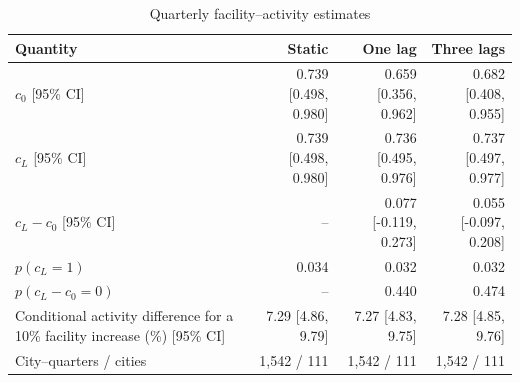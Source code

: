 \begin{table}[htbp]\centering\small\caption{Quarterly facility--activity estimates}\label{tab:quarterly_dynamic}
\begin{tabular}{@{}p{52mm}rrr@{}}\toprule
Quantity & Static & One lag & Three lags\\
\midrule
$c_0$ [95\% CI] & 0.739 [0.498, 0.980] & 0.659 [0.356, 0.962] & 0.682 [0.408, 0.955]\\
$c_L$ [95\% CI] & 0.739 [0.498, 0.980] & 0.736 [0.495, 0.976] & 0.737 [0.497, 0.977]\\
$c_L-c_0$ [95\% CI] & -- & 0.077 [-0.119, 0.273] & 0.055 [-0.097, 0.208]\\
$p(c_L=1)$ & 0.034 & 0.032 & 0.032\\
$p(c_L-c_0=0)$ & -- & 0.440 & 0.474\\
Conditional activity difference for a 10\% facility increase (\%) [95\% CI] & 7.29 [4.86, 9.79] & 7.27 [4.83, 9.75] & 7.28 [4.85, 9.76]\\
City--quarters / cities & 1,542 / 111 & 1,542 / 111 & 1,542 / 111\\
\bottomrule\end{tabular}\end{table}
